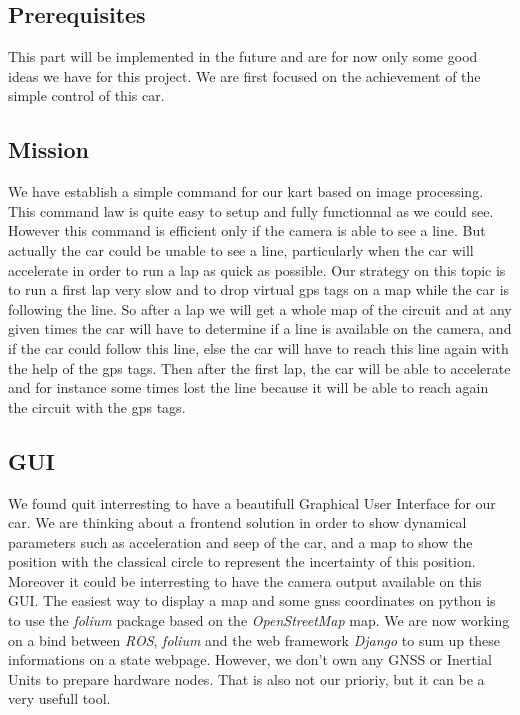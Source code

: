 \subsection{Prerequisites}
This part will be implemented in the future and are for now only some good
ideas we have for this project. We are first focused on the achievement of the simple
control of this car.

\subsection{Mission}
We have establish a simple command for our kart based on image processing. This
command law is quite easy to setup and fully functionnal as we could see. However
this command is efficient only if the camera is able to see a line. But actually
the car could be unable to see a line, particularly when the car will accelerate
in order to run a lap as quick as possible. Our strategy on this topic is to run
a first lap very slow and to drop virtual gps tags on a map while the car is following
the line. So after a lap we will get a whole map of the circuit and at any given times
the car will have to determine if a line is available on the camera, and if the car
could follow this line, else the car will have to reach this line again with the help
of the gps tags. Then after the first lap, the car will be able to accelerate and for instance some times
lost the line because it will be able to reach again the circuit with the gps tags.

\subsection{GUI}
We found quit interresting to have a beautifull Graphical User Interface for our
car. We are thinking about a frontend solution in order to show dynamical parameters
such as acceleration and seep of the car, and a map to show the position with the 
classical circle to represent the incertainty of this position. Moreover it could
be interresting to have the camera output available on this GUI. The easiest way to
display a map and some gnss coordinates on python is to use the \textit{folium} package
based on the \textit{OpenStreetMap} map. We are now working on a bind between \textit{ROS},
\textit{folium} and the web framework \textit{Django} to sum up these informations on
a state webpage. However, we don't own any GNSS or Inertial Units to prepare hardware
nodes. That is also not our prioriy, but it can be a very usefull tool.


